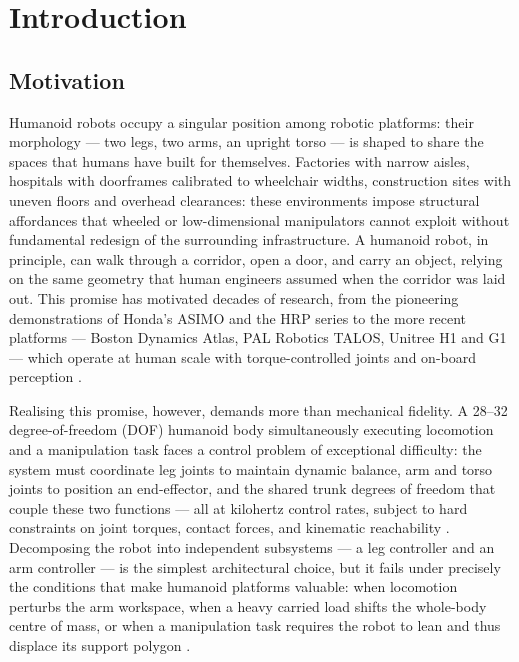 
\chapter{Introduction}
\label{chap:introduction}

\section{Motivation}
\label{sec:motivation}

Humanoid robots occupy a singular position among robotic platforms:
their morphology — two legs, two arms, an upright torso — is shaped to
share the spaces that humans have built for themselves. Factories with
narrow aisles, hospitals with doorframes calibrated to wheelchair widths,
construction sites with uneven floors and overhead clearances: these
environments impose structural affordances that wheeled or
low-dimensional manipulators cannot exploit without fundamental redesign
of the surrounding infrastructure. A humanoid robot, in principle, can
walk through a corridor, open a door, and carry an object, relying on
the same geometry that human engineers assumed when the corridor was
laid out. This promise has motivated decades of research, from the
pioneering demonstrations of Honda's ASIMO and the HRP series to the
more recent platforms — Boston Dynamics Atlas, PAL Robotics TALOS,
Unitree H1 and G1 — which operate at human scale with torque-controlled
joints and on-board perception \cite{Koolen2016}.

Realising this promise, however, demands more than mechanical fidelity.
A 28--32 degree-of-freedom (DOF) humanoid body simultaneously executing
locomotion and a manipulation task faces a control problem of exceptional
difficulty: the system must coordinate leg joints to maintain dynamic
balance, arm and torso joints to position an end-effector, and the
shared trunk degrees of freedom that couple these two functions — all
at kilohertz control rates, subject to hard constraints on joint
torques, contact forces, and kinematic reachability
\cite{Sentis2005,Wensing2013}. Decomposing the robot into independent
subsystems — a leg controller and an arm controller — is the simplest
architectural choice, but it fails under precisely the conditions that
make humanoid platforms valuable: when locomotion perturbs the arm
workspace, when a heavy carried load shifts the whole-body centre of
mass, or when a manipulation task requires the robot to lean and thus
displace its support polygon \cite{Koolen2016}.

